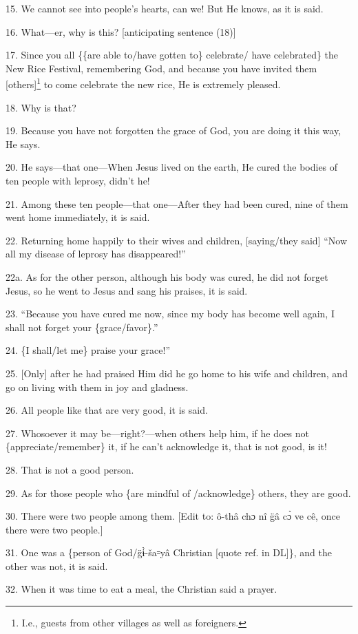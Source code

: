 15. We cannot see into people's hearts, can we! But He knows, as it is said.

16. What---er, why is this? [anticipating sentence (18)]

17. Since you all \{\{are able to/have gotten to\} celebrate/ have celebrated\}
the New Rice Festival, remembering God, and because you have invited them [others]\footnote{I.e., guests from other villages as well as foreigners.}
to come celebrate the new rice, He is extremely pleased.

18. Why is that?

19. Because you have not forgotten the grace of God, you are doing it this way,
He says.

20. He says---that one---When Jesus lived on the earth, He cured the bodies of
ten people with leprosy, didn't he!

21. Among these ten people---that one---After they had been cured, nine of them
went home immediately, it is said.

22. Returning home happily to their wives and children, [saying/they said] ``Now
all my disease of leprosy has disappeared!''

22a. As for the other person, although his body was cured, he did not forget Jesus,
so he went to Jesus and sang his praises, it is said.

23. ``Because you have cured me now, since my body has become well again, I shall
not forget your \{grace/favor\}.''

24. \{I shall/let me\} praise your grace!''

25. [Only] after he had praised Him did he go home to his wife and children, and
go on living with them in joy and gladness.

26. All people like that are very good, it is said.

27. Whosoever it may be---right?---when others help him, if he does not \{appreciate/remember\}
it, if he can't acknowledge it, that is not good, is it!

28. That is not a good person.

29. As for those people who \{are mindful of /acknowledge\} others, they are good.

30. There were two people among them. [Edit to: ô-thâ chɔ nî g̈â cɔ̀ ve
cê, once there were two people.]

31. One was a \{person of God/g̈ɨ̀-ša꞊yâ Christian [quote ref. in DL]\},
and the other was not, it is said.

32. When it was time to eat a meal, the Christian said a prayer.

